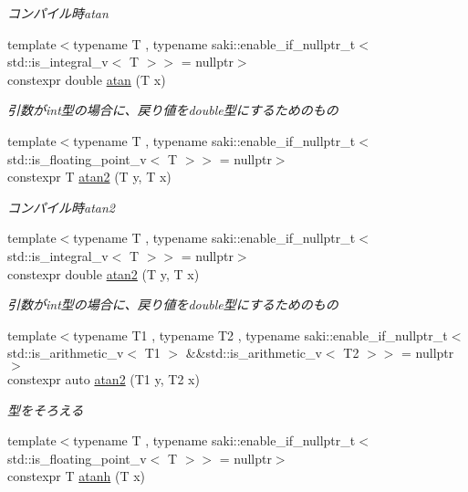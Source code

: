 \begin{DoxyCompactItemize}
\begin{DoxyCompactList}\small\item\em コンパイル時atan \end{DoxyCompactList}\item 
{\footnotesize template$<$typename T , typename saki\+::enable\+\_\+if\+\_\+nullptr\+\_\+t$<$ std\+::is\+\_\+integral\+\_\+v$<$ T $>$$>$  = nullptr$>$ }\\constexpr double \mbox{\hyperlink{namespacesaki_acd8a08085fc9210a4e8d61f6c04febe2}{atan}} (T x)
\begin{DoxyCompactList}\small\item\em 引数がint型の場合に、戻り値をdouble型にするためのもの \end{DoxyCompactList}\item 
{\footnotesize template$<$typename T , typename saki\+::enable\+\_\+if\+\_\+nullptr\+\_\+t$<$ std\+::is\+\_\+floating\+\_\+point\+\_\+v$<$ T $>$$>$  = nullptr$>$ }\\constexpr T \mbox{\hyperlink{namespacesaki_ac528a4ab6013623bfe6257229e302015}{atan2}} (T y, T x)
\begin{DoxyCompactList}\small\item\em コンパイル時atan2 \end{DoxyCompactList}\item 
{\footnotesize template$<$typename T , typename saki\+::enable\+\_\+if\+\_\+nullptr\+\_\+t$<$ std\+::is\+\_\+integral\+\_\+v$<$ T $>$$>$  = nullptr$>$ }\\constexpr double \mbox{\hyperlink{namespacesaki_a1f8c6dc6223b790f6d227c8d22cf8b86}{atan2}} (T y, T x)
\begin{DoxyCompactList}\small\item\em 引数がint型の場合に、戻り値をdouble型にするためのもの \end{DoxyCompactList}\item 
{\footnotesize template$<$typename T1 , typename T2 , typename saki\+::enable\+\_\+if\+\_\+nullptr\+\_\+t$<$ std\+::is\+\_\+arithmetic\+\_\+v$<$ T1 $>$ \&\&std\+::is\+\_\+arithmetic\+\_\+v$<$ T2 $>$$>$  = nullptr$>$ }\\constexpr auto \mbox{\hyperlink{namespacesaki_a3f53502e50280167d22bef45227219f0}{atan2}} (T1 y, T2 x)
\begin{DoxyCompactList}\small\item\em 型をそろえる \end{DoxyCompactList}\item 
{\footnotesize template$<$typename T , typename saki\+::enable\+\_\+if\+\_\+nullptr\+\_\+t$<$ std\+::is\+\_\+floating\+\_\+point\+\_\+v$<$ T $>$$>$  = nullptr$>$ }\\constexpr T \mbox{\hyperlink{namespacesaki_adbfceeab527c51676d00fae31e077dcf}{atanh}} (T x)

\end{DoxyCompactItemize}
